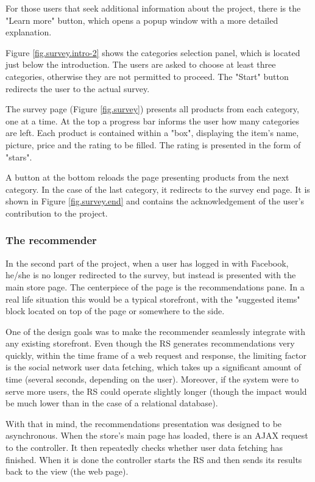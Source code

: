 \documentclass[12pt]{report}
\begin{document}
For those users that seek additional information about the project, there is the "Learn more" button, which opens a popup window with a more detailed explanation.

Figure \ref{fig.survey.intro-2} shows the categories selection panel, which is located just below the introduction. The users are asked to choose at least three categories, otherwise they are not permitted to proceed. The "Start" button redirects the user to the actual survey.

The survey page (Figure \ref{fig.survey}) presents all products from each category, one at a time. At the top a progress bar informs the user how many categories are left. Each product is contained within a "box", displaying the item's name, picture, price and the rating to be filled. The rating is presented in the form of "stars".

A button at the bottom reloads the page presenting products from the next category. In the case of the last category, it redirects to the survey end page. It is shown in Figure \ref{fig.survey.end} and contains the acknowledgement of the user's contribution to the project.

\subsubsection{The recommender}

In the second part of the project, when a user has logged in with Facebook, he/she is no longer redirected to the survey, but instead is presented with the main store page. The centerpiece of the page is the recommendations pane. In a real life situation this would be a typical storefront, with the "suggested items" block located on top of the page or somewhere to the side.

One of the design goals was to make the recommender seamlessly integrate with any existing storefront. Even though the RS generates recommendations very quickly, within the time frame of a web request and response, the limiting factor is the social network user data fetching, which takes up a significant amount of time (several seconds, depending on the user). Moreover, if the system were to serve more users, the RS could operate slightly longer (though the impact would be much lower than in the case of a relational database).

With that in mind, the recommendations presentation was designed to be asynchronous. When the store's main page has loaded, there is an AJAX request to the controller. It then repeatedly checks whether user data fetching has finished. When it is done the controller starts the RS and then sends its results back to the view (the web page). 
\end{document}
